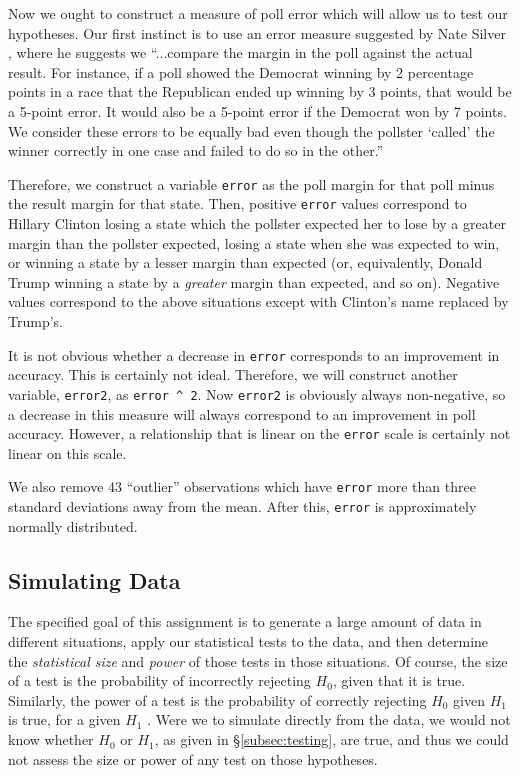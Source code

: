 \documentclass[11pt, oneside]{article}
\newcommand \Rcode[1]{{\texttt{\colorbox{codegray}{#1}}}}
\begin{document}
Now we ought to construct a measure of poll error which will allow us to test our hypotheses. Our first instinct is to use an error measure suggested by Nate Silver \cite{silver}, where he suggests we ``...compare the margin in the poll against the actual result. For instance, if a poll showed the Democrat winning by 2 percentage points in a race that the Republican ended up winning by 3 points, that would be a 5-point error. It would also be a 5-point error if the Democrat won by 7 points. We consider these errors to be equally bad even though the pollster `called' the winner correctly in one case and failed to do so in the other.''

Therefore, we construct a variable \Rcode{error} as the poll margin for that poll minus the result margin for that state. Then, positive \Rcode{error} values correspond to Hillary Clinton losing a state which the pollster expected her to lose by a greater margin than the pollster expected, losing a state when she was expected to win, or winning a state by a lesser margin than expected (or, equivalently, Donald Trump winning a state by a \emph{greater} margin than expected, and so on). Negative values correspond to the above situations except with Clinton's name replaced by Trump's. 

It is not obvious whether a decrease in \Rcode{error} corresponds to an improvement in accuracy. This is certainly not ideal. Therefore, we will construct another variable, \Rcode{error2}, as \Rcode{error \^{} 2}. Now \Rcode{error2} is obviously always non-negative, so a decrease in this measure will always correspond to an improvement in poll accuracy. However, a relationship that is linear on the \Rcode{error} scale is certainly not linear on this scale. 

We also remove 43 ``outlier'' observations which have \Rcode{error} more than three standard deviations away from the mean. After this, \Rcode{error} is approximately normally distributed. 

\subsection{Simulating Data}

The specified goal of this assignment is to generate a large amount of data in different situations, apply our statistical tests to the data, and then determine the \emph{statistical size} and \emph{power} of those tests in those situations. Of course, the size of a test is the probability of incorrectly rejecting $H_0$, given that it is true. Similarly, the power of a test is the probability of correctly rejecting $H_0$ given $H_1$ is true, for a given $H_1$ \cite{spec}. Were we to simulate directly from the data, we would not know whether $H_0$ or $H_1$, as given in \S\ref{subsec:testing}, are true, and thus we could not assess the size or power of any test on those hypotheses. 
\end{document}
